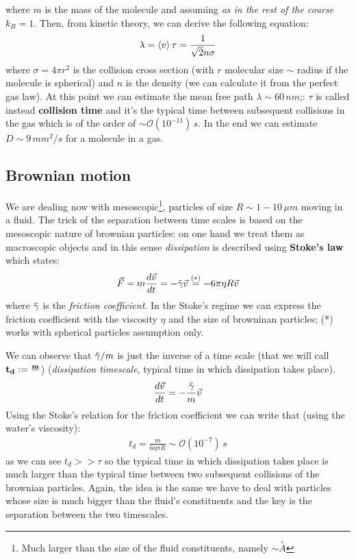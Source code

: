 \documentclass[\main/main.tex]{subfiles}
\begin{document}
where $m$ is the mass of the molecule and assuming \textit{as in the rest of the course} $k_B=1$.
Then, from kinetic theory, we can derive the following equation:
\begin{eqnarray}
\lambda=\left\langle v \right\rangle\tau=\frac{1}{\sqrt{2}n \sigma}
\end{eqnarray}
where $\sigma=4\pi r^2$ is the collision cross section (with $r$ molecular size $\sim$ radius if the molecule is spherical) and $n$ is the density (we can calculate it from the perfect gas law). At this point we can estimate the mean free path $\lambda\sim 60\, nm$;: $\tau$  is called instead \textbf{collision time} and it's the typical time between subsequent collisions in the gas which is of the order of $\sim \mathcal{O}(10^{-11})\,s$. 
In the end we can estimate $D\sim9\, mm^2/s$ for a molecule in a gas.

\subsection{Brownian motion}
We are dealing now with mesoscopic\footnote{Much larger than the size of the fluid constituents, namely $\sim \overset{\circ}{A}$}, particles of size $R\sim1-10\,\mu m$ moving in a fluid. The trick of the separation between time scales is based on the mesoscopic nature of brownian particles: on one hand we treat them as macroscopic objects and in this sense \textit{dissipation} is described using \textbf{Stoke's law} which states:
\begin{eqnarray}
\Vec{F}=m\frac{d\Vec{v}}{dt}=-\Tilde{\gamma}\Vec{v}\overset{(*)}{=}-6\pi\eta R\Vec{v} \\
\end{eqnarray}
where $\Tilde{\gamma}$ is the \textit{friction coefficient}. In the Stoke's regime we can express the friction coefficient with the viscosity $\eta$ and the size of browninan particles; (*) works with spherical particles assumption only.

We can observe that ${\Tilde{\gamma}}/{m}$ is just the inverse of a time scale (that we will call $\mathbf{t_d:=\frac{m}{\title{\gamma}}}$) (\textit{dissipation timescale}, typical time in which dissipation takes place). 
\begin{eqnarray}
\frac{d\Vec{v}}{dt}=-\frac{\Tilde{\gamma}}{m}\Vec{v} 
\end{eqnarray}
Using the Stoke's relation for the friction coefficient we can write that (using the water's viscosity):
\begin{eqnarray}
t_d=\frac{m}{6\eta\pi R} \sim \mathcal{O}(10^{-7})\,s
\end{eqnarray}
as we can see $t_d>>\tau$ so the typical time in which dissipation takes place is much larger than the typical time between two subsequent collisions of the brownian particles.
Again, the idea is the same we have to deal with particles whose size is much bigger than the fluid's constituents and the key is the separation between the two timescales.
\end{document}
